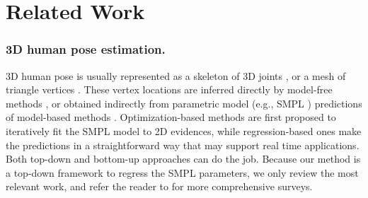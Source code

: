 \documentclass[runningheads]{llncs}
\begin{document}
\section{Related Work}

\subsubsection{3D human pose estimation.}
3D human pose is usually represented as a skeleton of 3D joints \cite{sharma2019monocular,wehrbein2021probabilistic,yu2021pcls,gong2021poseaug}, or a mesh of triangle vertices \cite{kanazawa2018end,kocabas2020vibe,moon2020i2l,choi2020pose2mesh,lin2021end,lin2021mesh}.
These vertex locations are inferred directly by model-free methods \cite{moon2020i2l,choi2020pose2mesh,lin2021end,lin2021mesh}, or obtained indirectly from parametric model (e.g., SMPL \cite{loper2015smpl}) predictions of model-based methods \cite{kanazawa2018end,kolotouros2019learning,kocabas2020vibe,sengupta2020synthetic,Rong_2019_ICCV}.
Optimization-based methods \cite{bogo2016keep,fang2021mirrored} are first proposed to iteratively fit the SMPL model to 2D evidences, while regression-based ones \cite{kanazawa2018end,pymaf2021} make the predictions in a straightforward way that may support real time applications.
Both top-down \cite{kolotouros2019learning,li2021hybrik,kocabas2021pare,lin2021mesh,zhang2020object} and bottom-up \cite{sun2021monocular,zhang2021bmp} approaches can do the job.
Because our method is a top-down framework to regress the SMPL parameters, we only review the most relevant work, and refer the reader to \cite{liu2021recent,tian2022hmrsurvey} for more comprehensive surveys.
\end{document}
